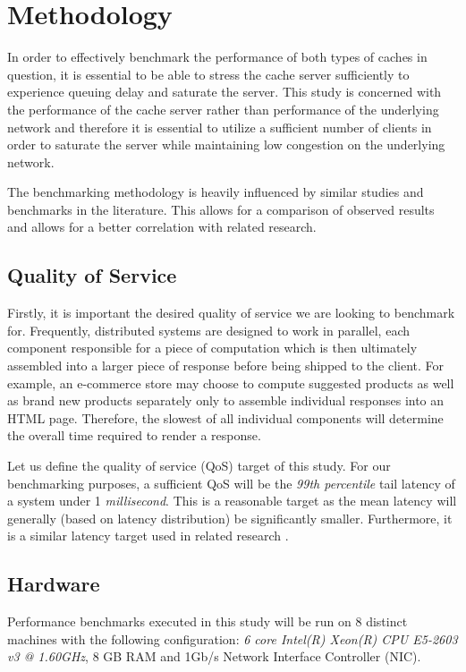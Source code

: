 \section{Methodology}

In order to effectively benchmark the performance of both types of caches in question, it is essential to be able to stress the cache server sufficiently to experience queuing delay and saturate the server. This study is concerned with the performance of the cache server rather than performance of the underlying network and therefore it is essential to utilize a sufficient number of clients in order to saturate the server while maintaining low congestion on the underlying network.

The benchmarking methodology is heavily influenced by similar studies and benchmarks in the literature. This allows for a comparison of observed results and allows for a better correlation with related research.


\subsection{Quality of Service}
Firstly, it is important the desired quality of service we are looking to benchmark for. Frequently, distributed systems are designed to work in parallel, each component responsible for a piece of computation which is then ultimately assembled into a larger piece of response before being shipped to the client. For example, an e-commerce store may choose to compute suggested products as well as brand new products separately only to assemble individual responses into an HTML page. Therefore, the slowest of all individual components will determine the overall time required to render a response.

Let us define the quality of service (QoS) target of this study. For our benchmarking purposes, a sufficient QoS will be the \textit{99th percentile} tail latency of a system under 1 \textit{millisecond}. This is a reasonable target as the mean latency will generally (based on latency distribution) be significantly smaller. Furthermore, it is a similar latency target used in related research \cite{leverich2014reconciling}.

\subsection{Hardware}
Performance benchmarks executed in this study will be run on 8 distinct machines with the following configuration: \textit{6 core Intel(R) Xeon(R) CPU E5-2603 v3 @ 1.60GHz}, 8 GB RAM and 1Gb/s Network Interface Controller (NIC).

